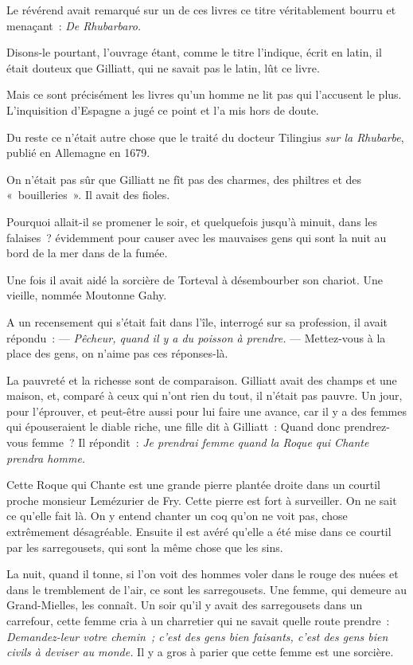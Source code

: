 \documentclass[french,twoside]{book} %
\begin{document}
Le révérend avait remarqué sur un de ces livres  ce titre véritablement bourru et menaçant : \emph{De Rhubarbaro.}\par
Disons-le pourtant, l’ouvrage étant, comme le titre l’indique, écrit en latin, il était douteux que Gilliatt, qui ne savait pas le latin, lût ce livre.\par
Mais ce sont précisément les livres qu’un homme ne lit pas qui l’accusent le plus. L’inquisition d’Espagne a jugé ce point et l’a mis hors de doute.\par
Du reste ce n’était autre chose que le traité du docteur Tilingius \emph{sur la Rhubarbe}, publié en Allemagne en 1679.\par
On n’était pas sûr que Gilliatt ne fît pas des charmes, des philtres et des « bouilleries ». Il avait des fioles.\par
Pourquoi allait-il se promener le soir, et quelquefois jusqu’à minuit, dans les falaises ? évidemment pour causer avec les mauvaises gens qui sont la nuit au bord de la mer dans de la fumée.\par
Une fois il avait aidé la sorcière de Torteval à désembourber son chariot. Une vieille, nommée Moutonne Gahy.\par
A un recensement qui s’était fait dans l’île, interrogé sur sa profession, il avait répondu : — \emph{Pêcheur, quand il y a du poisson à prendre.} — Mettez-vous à la place des gens, on n’aime pas ces réponses-là.\par
La pauvreté et la richesse sont de comparaison. Gilliatt avait des champs et une maison, et, comparé à ceux qui n’ont rien du tout, il n’était pas pauvre. Un jour, pour l’éprouver, et peut-être aussi pour lui faire une avance, car il y a des femmes qui épouseraient le  diable riche, une fille dit à Gilliatt : Quand donc prendrez-vous femme ? Il répondit : \emph{Je prendrai femme quand la Roque qui Chante prendra homme.}\par
Cette Roque qui Chante est une grande pierre plantée droite dans un courtil proche monsieur Lemézurier de Fry. Cette pierre est fort à surveiller. On ne sait ce qu’elle fait là. On y entend chanter un coq qu’on ne voit pas, chose extrêmement désagréable. Ensuite il est avéré qu’elle a été mise dans ce courtil par les sarregousets, qui sont la même chose que les sins.\par
La nuit, quand il tonne, si l’on voit des hommes voler dans le rouge des nuées et dans le tremblement de l’air, ce sont les sarregousets. Une femme, qui demeure au Grand-Mielles, les connaît. Un soir qu’il y avait des sarregousets dans un carrefour, cette femme cria à un charretier qui ne savait quelle route prendre : \emph{Demandez-leur votre chemin ; c’est des gens bien faisants, c’est des gens bien civils à deviser au monde.} Il y a gros à parier que cette femme est une sorcière.\par
\end{document}
